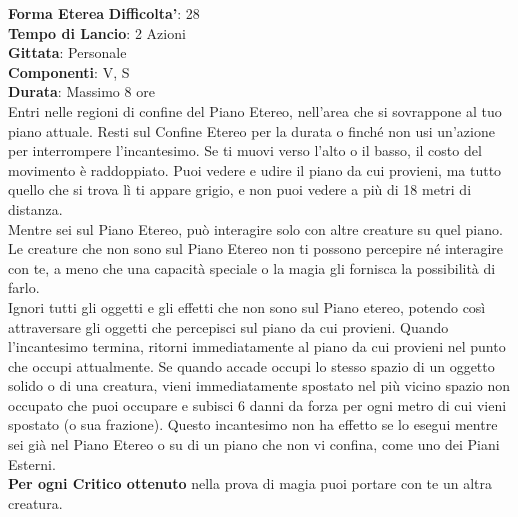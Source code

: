 \begin{multicols}{2}
\medskip\textbf{Forma Eterea}
\textbf{Difficolta'}: 28\\
\textbf{Tempo di Lancio}: 2 Azioni\\
\textbf{Gittata}: Personale\\
\textbf{Componenti}: V, S\\
\textbf{Durata}: Massimo 8 ore\\
Entri nelle regioni di confine del Piano Etereo, nell’area che si sovrappone al tuo piano attuale. Resti sul Confine Etereo per la durata o finché non usi un’azione per interrompere l’incantesimo. Se ti muovi verso l’alto o il basso, il costo del movimento è raddoppiato. Puoi vedere e udire il piano da cui provieni, ma tutto quello che si trova lì ti appare grigio, e non puoi vedere a più di 18 metri di distanza.\\
Mentre sei sul Piano Etereo, può interagire solo con altre creature su quel piano. Le creature che non sono sul Piano Etereo non ti possono percepire né interagire con te, a meno che una capacità speciale o la magia gli fornisca la possibilità di farlo.\\
Ignori tutti gli oggetti e gli effetti che non sono sul Piano etereo, potendo così attraversare gli  oggetti che percepisci sul piano da cui provieni. Quando l’incantesimo termina, ritorni immediatamente al piano da cui provieni nel punto che occupi attualmente. Se quando accade occupi lo stesso spazio di un oggetto solido o di una creatura, vieni immediatamente spostato nel più vicino spazio non occupato che puoi occupare e subisci 6 danni da forza per ogni metro di cui vieni spostato (o sua frazione). Questo incantesimo non ha effetto se lo esegui mentre sei già nel Piano Etereo o su di un piano che non vi confina, come uno dei Piani Esterni.\\
\textbf{Per ogni Critico ottenuto} nella prova di magia puoi portare con te un altra creatura.


\end{multicols}
